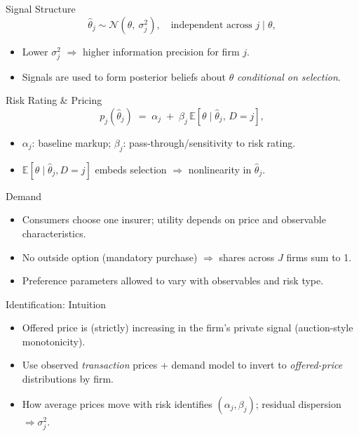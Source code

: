 \documentclass[10pt,aspectratio=169]{beamer}
\begin{document}
\begin{frame}{Signal Structure}
\justifying
\begin{equation}
\hat{\theta}_j \sim \mathcal{N}(\theta,\ \sigma_j^2), \quad \text{independent across } j \mid \theta, 
\label{eq:signal}
\end{equation}
\begin{itemize}
  \item Lower $\sigma_j^2$ $\Rightarrow$ higher information precision for firm $j$.
  \item Signals are used to form posterior beliefs about $\theta$ \emph{conditional on selection}.
\end{itemize}
\end{frame}

\begin{frame}{Risk Rating \& Pricing}
\justifying
\begin{equation}
p_j(\hat{\theta}_j) \;=\; \alpha_j \;+\; \beta_j \, \mathbb{E}[\theta \mid \hat{\theta}_j,\, D=j],
\label{eq:pricing}
\end{equation}
\begin{itemize}
  \item $\alpha_j$: baseline markup; $\beta_j$: pass-through/sensitivity to risk rating.
  \item $\mathbb{E}[\theta \mid \hat{\theta}_j, D=j]$ embeds selection $\Rightarrow$ nonlinearity in $\hat{\theta}_j$.
\end{itemize}
\end{frame}

\begin{frame}{Demand}
\justifying
\begin{itemize}
  \item Consumers choose one insurer; utility depends on price and observable characteristics.
  \item No outside option (mandatory purchase) $\Rightarrow$ shares across $J$ firms sum to 1.
  \item Preference parameters allowed to vary with observables and risk type.
\end{itemize}
\end{frame}

\begin{frame}{Identification: Intuition}
\justifying
\begin{itemize}
  \item Offered price is (strictly) increasing in the firm’s private signal (auction-style monotonicity).
  \item Use observed \emph{transaction} prices + demand model to invert to \emph{offered-price} distributions by firm.
  \item How average prices move with risk identifies $(\alpha_j,\beta_j)$; residual dispersion $\Rightarrow \sigma_j^2$.
\end{itemize}
\end{frame}
\end{document}
